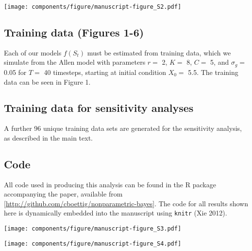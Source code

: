 \documentclass[]{components/elsarticle}
\begin{document}
\texttt{[image: components/figure/manuscript-figure\_S2.pdf]}

\newpage

\subsection{Training data (Figures
1-6)}\label{training-data-figures-1-6}

Each of our models $f(S_t)$ must be estimated from training data, which
we simulate from the Allen model with parameters $r = $ 2, $K =$ 8,
$C =$ 5, and $\sigma_g =$ 0.05 for $T=$ 40 timesteps, starting at
initial condition $X_0 = $ 5.5. The training data can be seen in Figure
1.

\subsection{Training data for sensitivity
analyses}\label{training-data-for-sensitivity-analyses}

A further 96 unique training data sets are generated for the sensitivity
analysis, as described in the main text.

\subsection{Code}\label{code}

All code used in producing this analysis can be found in the R package
accompanying the paper, available from
{[}\url{http://github.com/cboettig/nonparametric-bayes}{]}. The code for
all results shown here is dynamically embedded into the manuscript using
\texttt{knitr} (Xie 2012).

\texttt{[image: components/figure/manuscript-figure\_S3.pdf]}

\texttt{[image: components/figure/manuscript-figure\_S4.pdf]}
\end{document}
